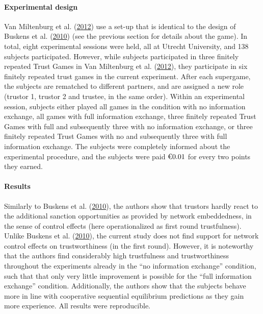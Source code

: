 \documentclass[
  11pt,
]{article}
\begin{document}
\hypertarget{experimental-design-5}{%
\paragraph{Experimental design}\label{experimental-design-5}}

Van Miltenburg et al. (\protect\hyperlink{ref-miltenburg_buskens_triads_2012}{2012}) use a set-up that is identical to the design of Buskens et al. (\protect\hyperlink{ref-buskens_raub_veer_triads_2010}{2010}) (see the previous section for details about the game).
In total, eight experimental sessions were held, all at Utrecht University, and 138 subjects participated. However, while subjects participated in three finitely repeated Trust Games in Van Miltenburg et al. (\protect\hyperlink{ref-miltenburg_buskens_triads_2012}{2012}), they participate in six finitely repeated trust games in the current experiment. After each supergame, the subjects are rematched to different partners, and are assigned a new role (trustor 1, trustor 2 and trustee, in the same order). Within an experimental session, subjects either played all games in the condition with no information exchange, all games with full information exchange, three finitely repeated Trust Games with full and subsequently three with no information exchange, or three finitely repeated Trust Games with no and subsequently three with full information exchange. The subjects were completely informed about the experimental procedure, and the subjects were paid \(\text{\texteuro}0.01\) for every two points they earned.

\hypertarget{results-6}{%
\paragraph{Results}\label{results-6}}

Similarly to Buskens et al. (\protect\hyperlink{ref-buskens_raub_veer_triads_2010}{2010}), the authors show that trustors hardly react to the additional sanction opportunities as provided by network embeddedness, in the sense of control effects (here operationalized as first round trustfulness).
Unlike Buskens et al. (\protect\hyperlink{ref-buskens_raub_veer_triads_2010}{2010}), the current study does not find support for network control effects on trustworthiness (in the first round). However, it is noteworthy that the authors find considerably high trustfulness and trustworthiness throughout the experiments already in the ``no information exchange'' condition, such that that only very little improvement is possible for the ``full information exchange'' condition. Additionally, the authors show that the subjects behave more in line with cooperative sequential equilibrium predictions as they gain more experience.
All results were reproducible.
\end{document}
